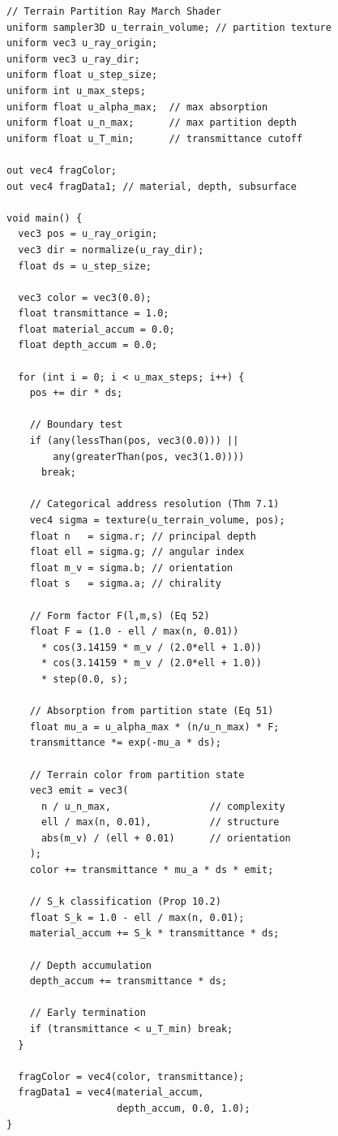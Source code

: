 \documentclass[10pt,twocolumn]{article}
\theoremstyle{definition}
\theoremstyle{remark}
\begin{document}
\begin{lstlisting}[style=glsl,caption={Terrain partition ray
march shader.},label=lst:shader]
// Terrain Partition Ray March Shader
uniform sampler3D u_terrain_volume; // partition texture
uniform vec3 u_ray_origin;
uniform vec3 u_ray_dir;
uniform float u_step_size;
uniform int u_max_steps;
uniform float u_alpha_max;  // max absorption
uniform float u_n_max;      // max partition depth
uniform float u_T_min;      // transmittance cutoff

out vec4 fragColor;
out vec4 fragData1; // material, depth, subsurface

void main() {
  vec3 pos = u_ray_origin;
  vec3 dir = normalize(u_ray_dir);
  float ds = u_step_size;

  vec3 color = vec3(0.0);
  float transmittance = 1.0;
  float material_accum = 0.0;
  float depth_accum = 0.0;

  for (int i = 0; i < u_max_steps; i++) {
    pos += dir * ds;

    // Boundary test
    if (any(lessThan(pos, vec3(0.0))) ||
        any(greaterThan(pos, vec3(1.0))))
      break;

    // Categorical address resolution (Thm 7.1)
    vec4 sigma = texture(u_terrain_volume, pos);
    float n   = sigma.r; // principal depth
    float ell = sigma.g; // angular index
    float m_v = sigma.b; // orientation
    float s   = sigma.a; // chirality

    // Form factor F(l,m,s) (Eq 52)
    float F = (1.0 - ell / max(n, 0.01))
      * cos(3.14159 * m_v / (2.0*ell + 1.0))
      * cos(3.14159 * m_v / (2.0*ell + 1.0))
      * step(0.0, s);

    // Absorption from partition state (Eq 51)
    float mu_a = u_alpha_max * (n/u_n_max) * F;
    transmittance *= exp(-mu_a * ds);

    // Terrain color from partition state
    vec3 emit = vec3(
      n / u_n_max,                 // complexity
      ell / max(n, 0.01),          // structure
      abs(m_v) / (ell + 0.01)      // orientation
    );
    color += transmittance * mu_a * ds * emit;

    // S_k classification (Prop 10.2)
    float S_k = 1.0 - ell / max(n, 0.01);
    material_accum += S_k * transmittance * ds;

    // Depth accumulation
    depth_accum += transmittance * ds;

    // Early termination
    if (transmittance < u_T_min) break;
  }

  fragColor = vec4(color, transmittance);
  fragData1 = vec4(material_accum,
                   depth_accum, 0.0, 1.0);
}
\end{lstlisting}
\end{document}

